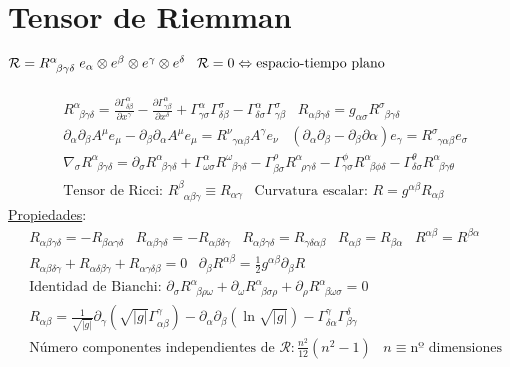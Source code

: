 \section*{Tensor de Riemman $\mathcal{R}=R^\alpha_{\;\;\beta\gamma\delta} \;e_\alpha\otimes e^\beta \otimes e^\gamma \otimes e^\delta\; \;\; \mathcal{R}=0\Leftrightarrow \normalfont\text{espacio-tiempo plano}$} 
\begin{align*}
&R^\alpha_{\; \; \beta \gamma \delta } = \frac{\partial \Gamma^\alpha_{\delta \beta }}{\partial  x^\gamma}- 
\frac{\partial \Gamma^\alpha_{\gamma\beta}}{\partial x^\delta}+\Gamma^\alpha_{\gamma\sigma}\Gamma^\sigma_{\delta\beta}-\Gamma^\alpha_{\delta\sigma}\Gamma^\sigma_{\gamma\beta}\; \; \; 
R_{\alpha \beta \gamma \delta }= g_{\alpha \sigma}R^\sigma_{\;\;\beta \gamma\delta}\\&
\partial_\alpha \partial_\beta A^\mu e_\mu - \partial_\beta \partial_\alpha A^\mu e_\mu = R^\nu_{\;\;\gamma\alpha\beta}A^\gamma e_\nu\;\;\; \left(\partial_\alpha\partial_\beta-\partial_\beta\partial \alpha \right)e_\gamma = R^\sigma_{\;\; \gamma\alpha\beta}e_\sigma
\\&\nabla_\sigma R^\alpha_{\;\;\beta \gamma \delta}= \partial_\sigma R^\alpha _{\;\;\beta \gamma\delta}+\Gamma^\alpha_{\omega\sigma}R^\omega_{\;\;\beta \gamma \delta }-\Gamma^\rho_{\beta\sigma}R^\alpha_{\;\;\rho\gamma\delta}-\Gamma^\phi_{\gamma\sigma}R^\alpha_{\;\;\beta\phi\delta}-
\Gamma^\theta_{\delta\sigma}R^\alpha_{\;\;\beta\gamma\theta}\\
&\text{Tensor de Ricci: } R^\beta_{\;\;\alpha\beta\gamma} \equiv
R_{\alpha\gamma}\;\;\; \text{Curvatura escalar: } R=g^{\alpha \beta}R_{\alpha \beta}
\end{align*}
\underline{Propiedades}:
\begin{align*}
&R_{\alpha \beta \gamma\delta}{=}- R_{\beta\alpha \gamma\delta}\;\;\;
R_{\alpha\beta\gamma\delta}{=}- R_{\alpha \beta \delta \gamma} \;\;\; R_{\alpha\beta\gamma\delta}{=} R_{\gamma \delta \alpha\beta} \;\;\; R_{\alpha \beta}{=}R_{\beta\alpha}\;\;\; R^{\alpha\beta}{=}R^{\beta\alpha}  \\ 
&R_{\alpha \beta\delta \gamma} + R_{\alpha \delta \beta \gamma}+R_{\alpha\gamma\delta\beta}=0  \;\;\;\partial_\beta R^{\alpha\beta}=\frac{1}{2}g^{\alpha \beta}\partial_\beta R 
\\
& \text{Identidad de Bianchi: }\partial_\sigma R^\alpha_{\;\;\beta\rho\omega}+ \partial_\omega R^\alpha_{\;\;\beta\sigma\rho}+
\partial_\rho R^\alpha_{\;\;\beta\omega\sigma} =0\\&
R_{\alpha \beta}=\frac{1}{\sqrt{|g|}}\partial_\gamma (\sqrt{|g|}\Gamma^\gamma_{\alpha \beta} )-\partial_\alpha\partial_\beta(\ln\sqrt{|g|})-\Gamma^\gamma_{\delta\alpha}\Gamma^\delta_{\beta\gamma}\\
&\text{Número componentes independientes de }\mathcal{R}: \frac{n^2}{12}(n^2-1)\;\;\; n\equiv\text{nº dimensiones}
\end{align*}



 


 